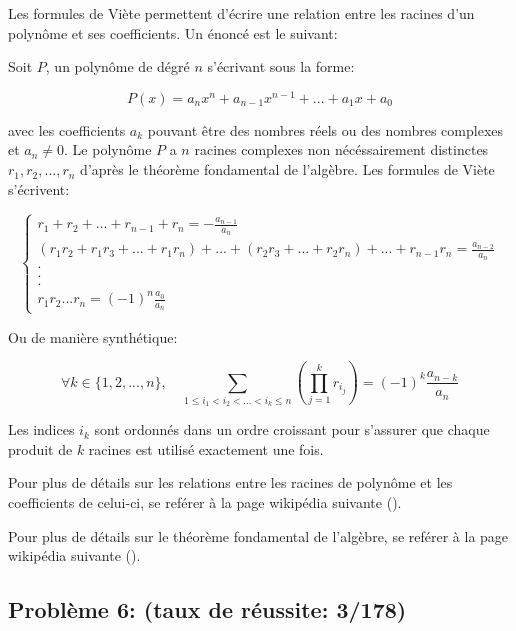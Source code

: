 \documentclass[12pt,a4paper,article]{memoir}
\begin{document}
\begin{myremark}[colback=red!5!white,colframe=blue!75!black,mytitle={Relation entre les coefficients et les racines d'un polynôme dite "de Viète"}, label=exfifth]
Les formules de Viète permettent d'écrire une relation entre les racines d'un polynôme et ses coefficients. Un énoncé est le suivant: 

\bigskip

Soit $P$, un polynôme de dégré $n$ s'écrivant sous la forme:

\[P(x) = a_{n}x^n + a_{n - 1}x^{n - 1} + ...  + a_{1}x + a_0 \]

avec les coefficients $a_{k}$ pouvant être des nombres réels ou des nombres complexes et $a_{n} \neq 0$. Le polynôme $P$ a $n$ racines complexes non nécéssairement distinctes $r_{1}, r_{2}, ..., r_{n}$ d'après le théorème fondamental de l'algèbre. Les formules de Viète s'écrivent:

\begin{equation}
\left\{
	\begin{array}{l}
	r_{1} + r_{2} + ... + r_{n-1} + r_{n} = -\frac{a_{n-1}}{a_{n}}\\
	(r_{1} r_{2} + r_{1} r_{3} + ... + r_{1} r_{n}) + ... + (r_{2} r_{3} + ... + r_{2} r_{n}) + ... + r_{n-1} r_{n} = \frac{a_{n-2}}{a_{n}}\\
	.\\
	.\\
	.\\
	r_{1} r_{2} ... r_{n} = (-1)^{n}\frac{a_{0}}{a_{n}}
	\end{array}
\right.
\label{equation-viete}
\end{equation}

Ou de manière synthétique:

\begin{equation}
\forall k \in \{1, 2, ..., n\}, \quad \sum_{1 \leq i_{1} < i_{2} < ... < i_{k} \leq n} \left(\prod_{j=1}^{k}r_{i_{j}}\right) = (-1)^{k}\frac{a_{n-k}}{a_n}
\label{equation-viete-synth}
\end{equation}

Les indices $i_{k}$ sont ordonnés dans un ordre croissant pour s'assurer que chaque produit de $k$ racines est utilisé exactement une fois.

\bigskip

Pour plus de détails sur les relations entre les racines de polynôme et les coefficients de celui-ci, se reférer à la page wikipédia suivante (\cite{wikiviete}).

\bigskip

Pour plus de détails sur le théorème fondamental de l'algèbre, se reférer à la page wikipédia suivante (\cite{wikifondalgebra}).
\end{myremark}

\subsection{Problème 6: (taux de réussite: 3/178)}

\printbibliography %
\end{document}
